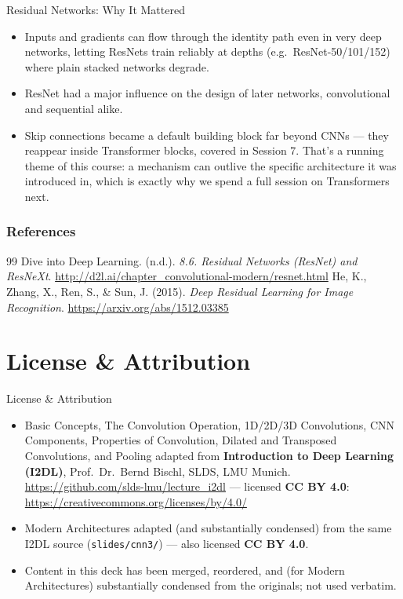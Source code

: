 \begin{frame}{Residual Networks: Why It Mattered}
    \begin{itemize}
        \item Inputs and gradients can flow through the identity path even in very deep networks, letting ResNets train reliably at depths (e.g.\ ResNet-50/101/152) where plain stacked networks degrade.
        \item ResNet had a major influence on the design of later networks, convolutional and sequential alike.
        \item Skip connections became a default building block far beyond CNNs --- they reappear inside Transformer blocks, covered in Session 7. That's a running theme of this course: a mechanism can outlive the specific architecture it was introduced in, which is exactly why we spend a full session on Transformers next.
    \end{itemize}
\end{frame}
\begin{vbframe}
\frametitle{References}
\footnotesize{
\begin{thebibliography}{99}
 Dive into Deep Learning. (n.d.). \textit{8.6. Residual Networks (ResNet) and ResNeXt}. \url{http://d2l.ai/chapter_convolutional-modern/resnet.html}
 He, K., Zhang, X., Ren, S., \& Sun, J. (2015). \textit{Deep Residual Learning for Image Recognition}. \url{https://arxiv.org/abs/1512.03385}
\end{thebibliography}
}
\end{vbframe}

\section{License \& Attribution}

\begin{vbframe}{License \& Attribution}
\begin{itemize}
\item Basic Concepts, The Convolution Operation, 1D/2D/3D Convolutions, CNN Components,
Properties of Convolution, Dilated and Transposed Convolutions, and Pooling adapted from
\textbf{Introduction to Deep Learning (I2DL)}, Prof.\ Dr.\ Bernd Bischl, SLDS, LMU Munich.
\url{https://github.com/slds-lmu/lecture_i2dl} --- licensed \textbf{CC BY 4.0}:
\url{https://creativecommons.org/licenses/by/4.0/}
\item Modern Architectures adapted (and substantially condensed) from the same I2DL source
(\texttt{slides/cnn3/}) --- also licensed \textbf{CC BY 4.0}.
\item Content in this deck has been merged, reordered, and (for Modern Architectures)
substantially condensed from the originals; not used verbatim.
\end{itemize}
\end{vbframe}

\endlecture

